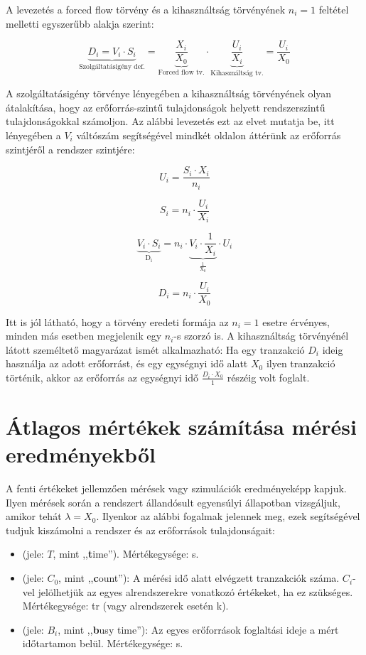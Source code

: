 A levezetés a forced flow törvény és a kihasználtság törvényének $n_i = 1$ feltétel melletti egyszerűbb alakja szerint:

$$\underbrace{D_i = V_i \cdot S_i}_\textrm{Szolgáltatásigény def.} =
\underbrace{\frac{X_i}{X_0}}_\textrm{Forced flow tv.} \cdot
\underbrace{\frac{U_i}{X_i}}_\textrm{Kihasználtság tv.} = \frac{U_i}{X_0}$$

A szolgáltatásigény törvénye lényegében a kihasználtság törvényének olyan átalakítása, hogy az erőforrás-szintű tulajdonságok helyett rendszerszintű tulajdonságokkal számoljon. Az alábbi levezetés ezt az elvet mutatja be, itt lényegében a $V_i$ váltószám segítségével mindkét oldalon áttérünk az erőforrás szintjéről a rendszer szintjére:

$$U_i = \frac{S_i \cdot X_i}{n_i}$$

$$S_i = n_i \cdot \frac{U_i}{X_i}$$

$$\underbrace{V_i \cdot S_i}_\mathrm{D_i} = n_i \cdot \underbrace{V_i \cdot \frac{1}{X_i}}_\mathrm{\frac{1}{X_0}} \cdot U_i$$

$$D_i = n_i \cdot \frac{U_i}{X_0}$$

Itt is jól látható, hogy a törvény eredeti formája az $n_i = 1$ esetre érvényes, minden más esetben megjelenik egy $n_i$-s szorzó is. A kihasználtság törvényénél látott személtető magyarázat ismét alkalmazható: Ha egy tranzakció $D_i$ ideig használja az adott erőforrást, és egy egységnyi idő alatt $X_0$ ilyen tranzakció történik, akkor az erőforrás az egységnyi idő $\frac{D_i \cdot X_0}{1}$ részéig volt foglalt.

\section{Átlagos mértékek számítása mérési eredményekből }

A fenti értékeket jellemzően mérések vagy szimulációk eredményeképp kapjuk. Ilyen mérések során a rendszert állandósult egyensúlyi állapotban vizsgáljuk, amikor tehát $\lambda = X_0$. Ilyenkor az alábbi fogalmak jelennek meg, ezek segítségével tudjuk kiszámolni a rendszer és az erőforrások tulajdonságait:

\begin{definicio}
\begin{itemize}
	\item {} (jele: $T$, mint ,,\textbf{t}ime''). Mértékegysége: s.
	\item {} (jele: $C_0$, mint ,,\textbf{c}ount''): A mérési idő alatt elvégzett tranzakciók száma. $C_i$-vel jelölhetjük az egyes alrendszerekre vonatkozó értékeket, ha ez szükséges. Mértékegysége: tr (vagy alrendszerek esetén k).
	\item {} (jele: $B_i$, mint ,,\textbf{b}usy time''): Az egyes erőforrások foglaltási ideje a mért időtartamon belül. Mértékegysége: s.
\end{itemize}
\end{definicio}

